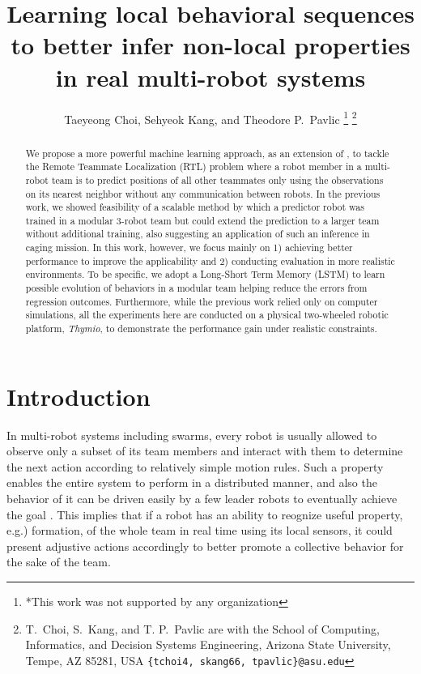 \documentclass[letterpaper, 10 pt, conference]{ieeeconf}  %
\title{\LARGE \bf
	Learning local behavioral sequences 
	to better infer non-local properties in real multi-robot systems
}
\author{Taeyeong Choi, Sehyeok Kang, and Theodore P.~Pavlic %
	\thanks{*This work was not supported by any organization}%
	\thanks{T.~Choi, S.~Kang, and T. P.~Pavlic are with the School of Computing, Informatics, and Decision Systems Engineering,
		Arizona State University, Tempe, AZ 85281, USA
		{\tt\small \{tchoi4, skang66, tpavlic\}@asu.edu}}%
}
\begin{document}
	
	\maketitle
	\thispagestyle{empty}
	\pagestyle{empty}
	
	
	\begin{abstract}
		
		We propose a more powerful machine learning approach, as an extension of \cite{CPR17},
		to tackle the Remote Teammate
		Localization (RTL) problem where a robot member in a multi-robot team is to predict positions
		of all other teammates only using the observations on its nearest neighbor without any
		communication between robots.
		In the previous work, we showed feasibility of a scalable method by which
		a predictor robot was trained in a modular 3-robot team but could extend the prediction
		to a larger
		team without additional training, also suggesting an application of such an inference in
		caging mission.         
		In this work, however, we focus mainly on 1) achieving better performance
		to improve the applicability and 2) conducting evaluation in
		more realistic environments. To be specific, we adopt a Long-Short Term Memory (LSTM) \cite{HS97}
		to learn possible evolution of behaviors in a modular team helping reduce the errors
		from regression outcomes. Furthermore, while the previous work relied only on computer simulations,
		all the experiments here are conducted on a physical two-wheeled robotic platform, \emph{Thymio},
		to demonstrate the performance gain under realistic constraints.
		
	\end{abstract}
	
	
	
	\section{Introduction}
	\label{sec:intro}
	
	In multi-robot systems including swarms, every robot is usually allowed to observe 
	only a subset of its team members and interact with them to determine the next action 
	according to relatively simple motion rules. 
	Such a property enables the entire system to perform in a distributed manner, and 
	also the behavior of it can be driven easily by a few leader robots to 
	eventually achieve the goal \cite{CPR17, DGRSS17, EB16, Stern18}. 
	This implies that if a robot has an ability to reognize useful property, e.g.) formation, 
	of the whole team in real time using its local sensors, 
	it could present adjustive actions accordingly to better promote a collective behavior 
	for the sake of the team.
	
\end{document}
